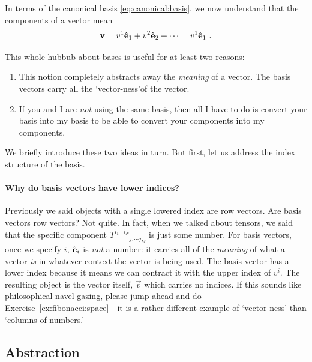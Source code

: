 \documentclass[12pt, oneside]{report}    %
\begin{document}
In terms of the canonical basis \eqref{eq:canonical:basis}, we now understand that the components of a vector mean
\begin{align}
    \mathbf{v} = v^1 \hat{\mathbf{e}}_1 + v^2 \hat{\mathbf{e}}_2 + \cdots = v^1 \hat{\mathbf{e}}_1 \ .
\end{align}

\begin{bigidea}\label{idea:reasons:to:like:bases}
This whole hubbub about bases is useful for at least two reasons:
\begin{enumerate}
    \item This notion completely abstracts away the \emph{meaning} of a vector. The basis vectors carry all the `vector-ness'\sidenotemark of the vector. 
    \item If you and I are \emph{not} using the same basis, then all I have to do is convert your basis into my basis to be able to convert your components into my components.
\end{enumerate}
\end{bigidea}

We briefly introduce these two ideas in turn. But first, let us address the index structure of the basis.

\paragraph{Why do basis vectors have lower indices?} Previously we said objects with a single lowered index are row vectors. Are basis vectors row vectors? Not quite. In fact, when we talked about tensors, we said that the specific component $T^{i_1\cdots i_N}_{\phantom{{i_1\cdots i_N}}j_1\cdots j_M}$ is just some number. For basis vectors, once we specify $i$, $\hat{\mathbf{e}}_i$ is \emph{not} a number: it carries all of the \emph{meaning} of what a vector \emph{is} in whatever context the vector is being used. The basis vector has a lower index because it means we can contract it with the upper index of $v^i$. The resulting object is the vector itself, $\vec{v}$ which carries no indices. If this sounds like philosophical navel gazing, please jump ahead and do Exercise~\ref{ex:fibonacci:space}---it is a rather different example of `vector-ness' than `columns of numbers.'





\subsection{Abstraction}
\label{sec:sub:abstraction:basis}
\end{document}
